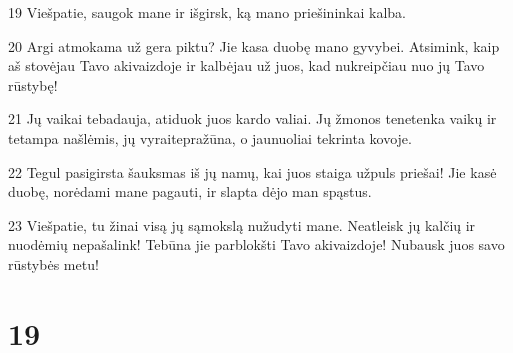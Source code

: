 \par 19 Viešpatie, saugok mane ir išgirsk, ką mano priešininkai kalba. 
\par 20 Argi atmokama už gera piktu? Jie kasa duobę mano gyvybei. Atsimink, kaip aš stovėjau Tavo akivaizdoje ir kalbėjau už juos, kad nukreipčiau nuo jų Tavo rūstybę! 
\par 21 Jų vaikai tebadauja, atiduok juos kardo valiai. Jų žmonos tenetenka vaikų ir tetampa našlėmis, jų vyrai­tepražūna, o jaunuoliai tekrinta kovoje. 
\par 22 Tegul pasigirsta šauksmas iš jų namų, kai juos staiga užpuls priešai! Jie kasė duobę, norėdami mane pagauti, ir slapta dėjo man spąstus. 
\par 23 Viešpatie, tu žinai visą jų sąmokslą nužudyti mane. Neatleisk jų kalčių ir nuodėmių nepašalink! Tebūna jie parblokšti Tavo akivaizdoje! Nubausk juos savo rūstybės metu!



\chapter{19}


